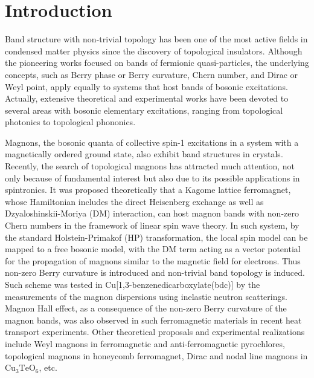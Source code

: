 \documentclass[amsmath,superscriptaddress,showpacs,aps,prb,twocolumn]{revtex4-1}
\begin{document}
\section{Introduction}
\par Band structure with non-trivial topology\cite{BLD_RMP2016} has been one of the most active fields in condensed matter physics since the discovery of topological insulators\cite{HK_RMP2010,QZ_RMP2011}. Although the pioneering works focused on bands of fermionic quasi-particles\cite{H_PRL1988,K_PU2001,KM_PRL2005,BHZ_S2006,QHRZ_PRL2009,YXL_PRL2011}, the underlying concepts, such as Berry phase or Berry curvature\cite{B_PRSA1984}, Chern number\cite{TKNN_PRL1982,S_PRL1983}, and Dirac or Weyl point\cite{WAVS_PRB2011}, apply equally to systems that host bands of bosonic excitations. Actually, extensive theoretical and experimental works have been devoted to several areas with bosonic elementary excitations, ranging from topological photonics\cite{LJS_NP2014} to topological phononics\cite{PP_PRL2009}.

\par Magnons, the bosonic quanta of collective spin-1 excitations in a system with a magnetically ordered ground state, also exhibit band structures in crystals. Recently, the search of topological magnons has attracted much attention\cite{OIKSNT_S2010,ZRWL_PRB2013,CHFSBNL_PRL2015,LLKBYC_NC2016,MHJM_PRL_2016,O_JPCM2016,RNF_NJP2016,MS_PRB2017,SWW_PRB2017,LF_PRL2017,M_NP2017,MHM_PRB2017,LLHLF_arXiv2017,YLWXDIKLFL_arXiv2017,BWWCLMWRDAWYJW_arXiv2017}, not only because of fundamental interest but also due to its possible applications in spintronics\cite{CVSH_NP2015}. It was proposed theoretically\cite{OIKSNT_S2010,ZRWL_PRB2013} that a Kagome lattice ferromagnet, whose Hamiltonian includes the direct Heisenberg exchange as well as Dzyaloshinskii-Moriya (DM) interaction\cite{D_JPCS1958,M_PR1960}, can host magnon bands with non-zero Chern numbers in the framework of linear spin wave theory. In such system, by the standard Holstein-Primakof (HP) transformation\cite{HP_PR1940}, the local spin model can be mapped to a free bosonic model, with the DM term acting as a vector potential for the propagation of magnons similar to the magnetic field for electrons. Thus non-zero Berry curvature is introduced and non-trivial band topology is induced. Such scheme was tested in Cu[1,3-benzenedicarboxylate(bdc)] by the measurements of the magnon dispersions using inelastic neutron scatterings\cite{CHFSBNL_PRL2015}. Magnon Hall effect\cite{KNL_PRL2010}, as a consequence of the non-zero Berry curvature of the magnon bands, was also observed in such ferromagnetic materials in recent heat transport experiments\cite{OIKSNT_S2010,HCLO_PRL2015}. Other theoretical proposals and experimental realizations include Weyl magnons in ferromagnetic and anti-ferromagnetic pyrochlores\cite{LLKBYC_NC2016,MHJM_PRL_2016,SWW_PRB2017}, topological magnons in honeycomb ferromagnet\cite{O_JPCM2016}, Dirac and nodal line magnons in $\text{Cu}_3\text{TeO}_6$\cite{LLHLF_arXiv2017,YLWXDIKLFL_arXiv2017,BWWCLMWRDAWYJW_arXiv2017}, etc.
\end{document}
